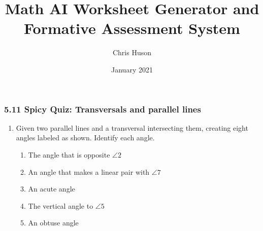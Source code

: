 \documentclass[12pt, twoside]{article}
\title{Math AI Worksheet Generator and Formative Assessment System}
\author{Chris Huson}
\date{January 2021}
\begin{document}
\subsubsection*{5.11 Spicy Quiz: Transversals and parallel lines}
\begin{enumerate}

\item Given two parallel lines and a transversal intersecting them, creating eight angles labeled as shown. Identify each angle.
  \begin{multicols}{2}
    \begin{enumerate}[itemsep=0.75cm]
      \item The angle that is opposite $\angle 2$
      \item An angle that makes a linear pair with $\angle 7$
      \item An acute angle
      \item The vertical angle to $\angle 5$
      \item An obtuse angle
    \end{enumerate}
    \begin{flushright}
  \end{flushright}
  \end{multicols}


\end{enumerate}
\end{document}
